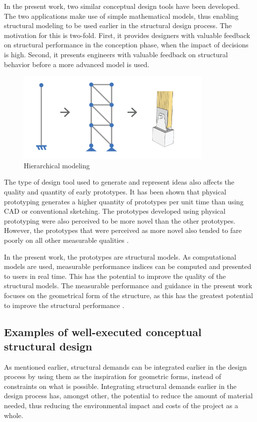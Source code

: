 In the present work, two similar conceptual design tools have been developed. The two applications make use of simple mathematical models, thus enabling structural modeling to be used earlier in the structural design process. The motivation for this is two-fold. First, it provides designers with valuable feedback on structural performance in the conception phase, when the impact of decisions is high. Second, it presents engineers with valuable feedback on structural behavior before a more advanced model is used. 

\begin{figure}
  \includegraphics[width=270pt]{graphics/hiarchical-modelling.png}
  \caption{Hierarchical modeling}
  \label{fig:hiarchical-modelling}
\end{figure}

The type of design tool used to generate and represent ideas also affects the quality and quantity of early prototypes. It has been shown \cite{Haggman2015} that physical prototyping generates a higher quantity of prototypes per unit time than using CAD or conventional sketching. The prototypes developed using physical prototyping were also perceived to be more novel than the other prototypes. However, the prototypes that were perceived as more novel also tended to fare poorly on all other measurable qualities \cite{Haggman2015}. 

In the present work, the prototypes are structural models. As computational models are used, measurable performance indices can be computed and presented to users in real time. This has the potential to improve the quality of the structural models. The measurable performance and guidance in the present work focuses on the geometrical form of the structure, as this has the greatest potential to improve the structural performance \cite{Mueller2014}. 

\subsection{Examples of well-executed conceptual structural design}
As mentioned earlier, structural demands can be integrated earlier in the design process by using them as the inspiration for geometric forms, instead of constraints on what is possible. Integrating structural demands earlier in the design process has, amongst other, the potential to reduce the amount of material needed, thus reducing the environmental impact and costs of the project as a whole. 

